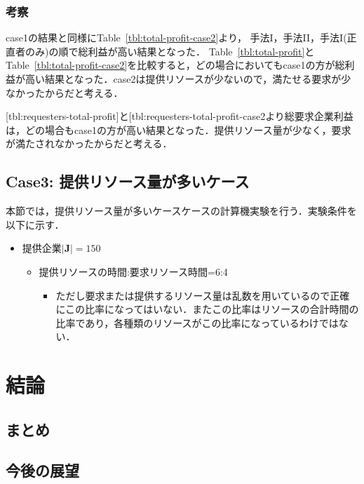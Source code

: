 \hypertarget{ux8003ux5bdf-10}{%
\subsection{考察}\label{ux8003ux5bdf-10}}

case1の結果と同様にTable~\ref{tbl:total-profit-case2}より，
手法I，手法II，手法I(正直者のみ)の順で総利益が高い結果となった．
Table~\ref{tbl:total-profit}とTable~\ref{tbl:total-profit-case2}を比較すると，どの場合においてもcase1の方が総利益が高い結果となった．case2は提供リソースが少ないので，満たせる要求が少なかったからだと考える．

{[}tbl:requesters-total-profit{]}と{[}tbl:requesters-total-profit-case2より総要求企業利益は，どの場合もcase1の方が高い結果となった．提供リソース量が少なく，要求が満たされなかったからだと考える．

\hypertarget{case3-ux63d0ux4f9bux30eaux30bdux30fcux30b9ux91cfux304cux591aux3044ux30b1ux30fcux30b9}{%
\section{Case3:
提供リソース量が多いケース}\label{case3-ux63d0ux4f9bux30eaux30bdux30fcux30b9ux91cfux304cux591aux3044ux30b1ux30fcux30b9}}

本節では，提供リソース量が多いケースケースの計算機実験を行う．実験条件を以下に示す．

\begin{itemize}
\tightlist
\item
  提供企業\(|\boldsymbol{J}|=150\)

  \begin{itemize}
  \tightlist
  \item
    提供リソースの時間:要求リソース時間=6:4

    \begin{itemize}
    \tightlist
    \item
      ただし要求または提供するリソース量は乱数を用いているので正確にこの比率になってはいない．またこの比率はリソースの合計時間の比率であり，各種類のリソースがこの比率になっているわけではない．
    \end{itemize}
  \end{itemize}
\end{itemize}

\hypertarget{ux7d50ux8ad6}{%
\chapter{結論}\label{ux7d50ux8ad6}}

\hypertarget{ux307eux3068ux3081-2}{%
\section{まとめ}\label{ux307eux3068ux3081-2}}

\hypertarget{ux4ecaux5f8cux306eux5c55ux671b}{%
\section{今後の展望}\label{ux4ecaux5f8cux306eux5c55ux671b}}

